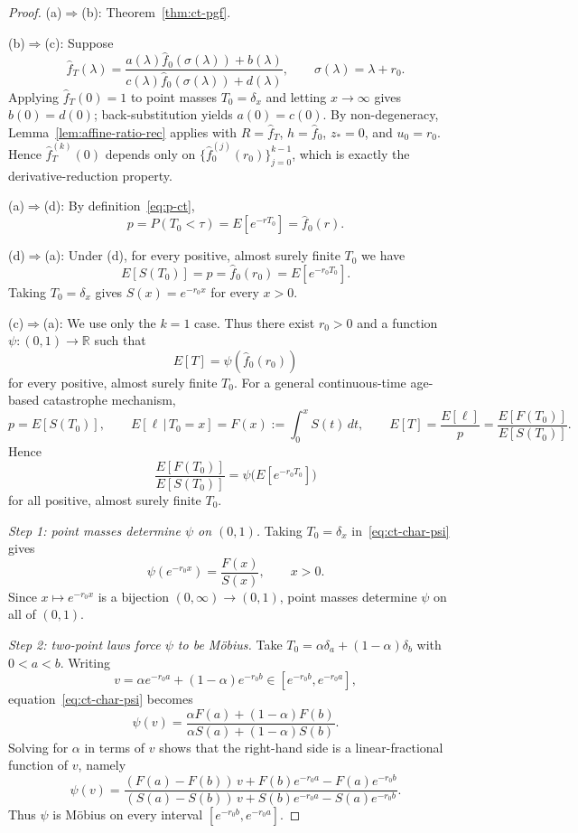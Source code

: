 \documentclass[11pt]{article}
\theoremstyle{plain}
\theoremstyle{definition}
\theoremstyle{remark}
\begin{document}
\begin{proof}
(a)$\Rightarrow$(b): Theorem~\ref{thm:ct-pgf}.

(b)$\Rightarrow$(c): Suppose
\[
  \hat f_T(\lambda)=\frac{a(\lambda)\hat f_0(\sigma(\lambda))+b(\lambda)}
  {c(\lambda)\hat f_0(\sigma(\lambda))+d(\lambda)},
  \qquad \sigma(\lambda)=\lambda+r_0.
\]
Applying $\hat f_T(0)=1$ to point masses $T_0=\delta_x$ and letting $x\to\infty$ gives $b(0)=d(0)$; back-substitution yields $a(0)=c(0)$. By non-degeneracy, Lemma~\ref{lem:affine-ratio-rec} applies with $R=\hat f_T$, $h=\hat f_0$, $z_*=0$, and $u_0=r_0$. Hence $\hat f_T^{(k)}(0)$ depends only on $\{\hat f_0^{(j)}(r_0)\}_{j=0}^{k-1}$, which is exactly the derivative-reduction property.

(a)$\Rightarrow$(d): By definition~\eqref{eq:p-ct},
\[
  p=P(T_0<\tau)=E[e^{-rT_0}]=\hat f_0(r).
\]

(d)$\Rightarrow$(a): Under (d), for every positive, almost surely finite
$T_0$ we have
\[
  E[S(T_0)] = p = \hat f_0(r_0)=E[e^{-r_0 T_0}].
\]
Taking $T_0=\delta_x$ gives $S(x)=e^{-r_0 x}$ for every $x>0$.

(c)$\Rightarrow$(a): We use only the $k=1$ case.  Thus there exist
$r_0>0$ and a function $\psi:(0,1)\to\mathbb R$ such that
\[
  E[T]=\psi(\hat f_0(r_0))
\]
for every positive, almost surely finite $T_0$.
For a general continuous-time age-based catastrophe mechanism,
\[
  p=E[S(T_0)],\qquad
  E[\ell\,|\,T_0=x]=F(x):=\int_0^x S(t)\,dt,
\qquad
  E[T]=\frac{E[\ell]}{p}
      =\frac{E[F(T_0)]}{E[S(T_0)]}.
\]
Hence
\begin{equation}\label{eq:ct-char-psi}
  \frac{E[F(T_0)]}{E[S(T_0)]}
  =\psi\!\bigl(E[e^{-r_0 T_0}]\bigr)
\end{equation}
for all positive, almost surely finite $T_0$.

\emph{Step 1: point masses determine $\psi$ on $(0,1)$.}
Taking $T_0=\delta_x$ in~\eqref{eq:ct-char-psi} gives
\[
  \psi(e^{-r_0 x})=\frac{F(x)}{S(x)}, \qquad x>0.
\]
Since $x\mapsto e^{-r_0 x}$ is a bijection $(0,\infty)\to(0,1)$, point
masses determine $\psi$ on all of $(0,1)$.

\emph{Step 2: two-point laws force $\psi$ to be M\"obius.}
Take $T_0=\alpha\delta_a+(1-\alpha)\delta_b$ with $0<a<b$.  Writing
\[
  v=\alpha e^{-r_0 a}+(1-\alpha)e^{-r_0 b}\in[e^{-r_0 b},e^{-r_0 a}],
\]
equation~\eqref{eq:ct-char-psi} becomes
\[
  \psi(v)
  =
  \frac{\alpha F(a)+(1-\alpha)F(b)}
       {\alpha S(a)+(1-\alpha)S(b)}.
\]
Solving for $\alpha$ in terms of $v$ shows that the right-hand side is a
linear-fractional function of $v$, namely
\[
  \psi(v)
  =
  \frac{(F(a)-F(b))\,v + F(b)e^{-r_0 a}-F(a)e^{-r_0 b}}
       {(S(a)-S(b))\,v + S(b)e^{-r_0 a}-S(a)e^{-r_0 b}}.
\]
Thus $\psi$ is M\"obius on every interval
$[e^{-r_0 b},e^{-r_0 a}]$.


\end{proof}
\end{document}
